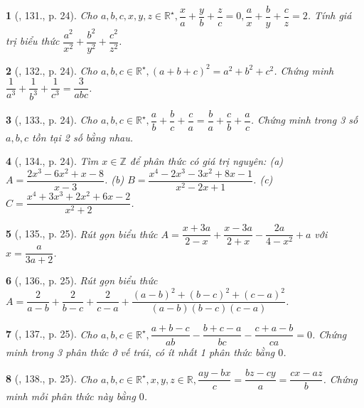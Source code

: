 \documentclass{article}
\newtheorem{baitoan}{}
\begin{document}
\begin{baitoan}[\cite{Binh_Toan_8_tap_1}, 131., p. 24]
	Cho $a,b,c,x,y,z\in\mathbb{R}^\star,\dfrac{x}{a} + \dfrac{y}{b} + \dfrac{z}{c} = 0,\dfrac{a}{x} + \dfrac{b}{y} + \dfrac{c}{z} = 2$. Tính giá trị biểu thức $\dfrac{a^2}{x^2} + \dfrac{b^2}{y^2} + \dfrac{c^2}{z^2}$.
\end{baitoan}

\begin{baitoan}[\cite{Binh_Toan_8_tap_1}, 132., p. 24]
	Cho $a,b,c\in\mathbb{R}^\star,(a + b + c)^2 = a^2 + b^2 + c^2$. Chứng minh $\dfrac{1}{a^3} + \dfrac{1}{b^3} + \dfrac{1}{c^3} = \dfrac{3}{abc}$.
\end{baitoan}

\begin{baitoan}[\cite{Binh_Toan_8_tap_1}, 133., p. 24]
	Cho $a,b,c\in\mathbb{R}^\star,\dfrac{a}{b} + \dfrac{b}{c} + \dfrac{c}{a} = \dfrac{b}{a} + \dfrac{c}{b} + \dfrac{a}{c}$. Chứng minh trong 3 số $a,b,c$ tồn tại 2 số bằng nhau.
\end{baitoan}

\begin{baitoan}[\cite{Binh_Toan_8_tap_1}, 134., p. 24]
	Tìm $x\in\mathbb{Z}$ để phân thức có giá trị nguyên: (a) $A = \dfrac{2x^3 - 6x^2 + x - 8}{x - 3}$. (b) $B = \dfrac{x^4 - 2x^3 - 3x^2 + 8x - 1}{x^2 - 2x + 1}$. (c) $C = \dfrac{x^4 + 3x^3 + 2x^2 + 6x - 2}{x^2 + 2}$.
\end{baitoan}

\begin{baitoan}[\cite{Binh_Toan_8_tap_1}, 135., p. 25]
	Rút gọn biểu thức $A = \dfrac{x + 3a}{2 - x} + \dfrac{x - 3a}{2 + x} - \dfrac{2a}{4 - x^2} + a$ với $x = \dfrac{a}{3a + 2}$.
\end{baitoan}

\begin{baitoan}[\cite{Binh_Toan_8_tap_1}, 136., p. 25]
	Rút gọn biểu thức $A = \dfrac{2}{a - b} + \dfrac{2}{b - c} + \dfrac{2}{c - a} + \dfrac{(a - b)^2 + (b - c)^2 + (c - a)^2}{(a - b)(b - c)(c - a)}$.
\end{baitoan}

\begin{baitoan}[\cite{Binh_Toan_8_tap_1}, 137., p. 25]
	Cho $a,b,c\in\mathbb{R}^\star,\dfrac{a + b - c}{ab} - \dfrac{b + c - a}{bc} - \dfrac{c + a - b}{ca} = 0$. Chứng minh trong 3 phân thức ở vế trái, có ít nhất 1 phân thức bằng $0$.
\end{baitoan}

\begin{baitoan}[\cite{Binh_Toan_8_tap_1}, 138., p. 25]
	Cho $a,b,c\in\mathbb{R}^\star,x,y,z\in\mathbb{R},\dfrac{ay - bx}{c} = \dfrac{bz - cy}{a} = \dfrac{cx - az}{b}$. Chứng minh mỗi phân thức này bằng $0$.
\end{baitoan}
\end{document}
